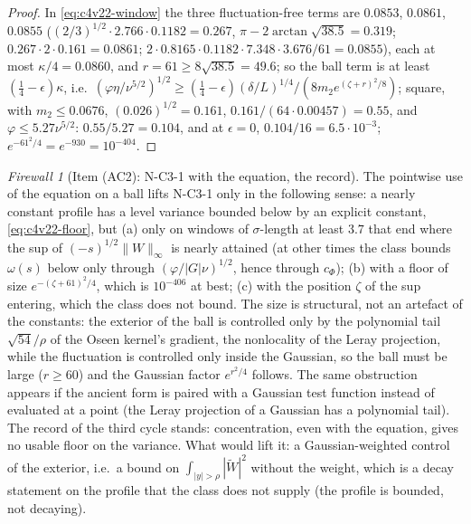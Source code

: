 \documentclass[11pt]{article}
\theoremstyle{plain}
\theoremstyle{definition}
\theoremstyle{remark}
\newtheorem{firewall}[theorem]{Firewall}
\begin{document}
\begin{proof}
In \eqref{eq:c4v22-window} the three fluctuation-free terms are
\(0.0853\), \(0.0861\), \(0.0855\) (\((2/3)^{1/2}\cdot2.766\cdot0.1182=0.267\), \(\pi-2\arctan\sqrt{38.5}=0.319\);
\(0.267\cdot2\cdot0.161=0.0861\); \(2\cdot0.8165\cdot0.1182\cdot7.348\cdot3.676/61=0.0855\)), each at most
\(\kappa/4=0.0860\), and \(r=61\ge8\sqrt{38.5}=49.6\); so the ball term is at least
\((\frac14-\epsilon)\kappa\), i.e.\ \((\varphi\eta/\nu^{5/2})^{1/2}\ge(\frac14-\epsilon)(\delta/L)^{1/4}/(8m_2e^{(\zeta+r)^2/8})\); square, with
\(m_2\le0.0676\), \((0.026)^{1/2}=0.161\), \(0.161/(64\cdot0.00457)=0.55\), and \(\varphi\le5.27\nu^{5/2}\):
\(0.55/5.27=0.104\), and at \(\epsilon=0\), \(0.104/16=6.5\cdot10^{-3}\); \(e^{-61^2/4}=e^{-930}=10^{-404}\).
\end{proof}

\begin{firewall}[Item (AC2): N-C3-1 with the equation, the record]
\label{fw:c4v22-record}
The pointwise use of the equation on a ball lifts N-C3-1 only in the
following sense: a nearly constant profile has a level variance
bounded below by an explicit constant, \eqref{eq:c4v22-floor}, but (a)
only on windows of \(\sigma\)-length at least \(3.7\) that end where the sup
of \((-s)^{1/2}\|W\|_\infty\) is nearly attained (at other times the class bounds
\(\omega(s)\) below only through \((\varphi/|G|\nu)^{1/2}\), hence through \(c_\Phi\)); (b) with
a floor of size \(e^{-(\zeta+61)^2/4}\), which is \(10^{-406}\) at best; (c) with the
position \(\zeta\) of the sup entering, which the class does not bound.
The size is structural, not an artefact of the constants: the
exterior of the ball is controlled only by the polynomial tail
\(\sqrt{54}/\rho\) of the Oseen kernel's gradient, the nonlocality of the
Leray projection, while the fluctuation is controlled only inside
the Gaussian, so the ball must be large (\(r\ge60\)) and the Gaussian
factor \(e^{r^2/4}\) follows.  The same obstruction appears if the ancient
form is paired with a Gaussian test function instead of evaluated at
a point (the Leray projection of a Gaussian has a polynomial tail).
The record of the third cycle stands: concentration, even with the
equation, gives no usable floor on the variance.  What would lift it:
a Gaussian-weighted control of the exterior, i.e.\ a bound on
\(\int_{|y|>\rho}|\widetilde W|^2\) without the weight, which is a decay statement on the
profile that the class does not supply (the profile is bounded, not
decaying).
\end{firewall}
\end{document}
